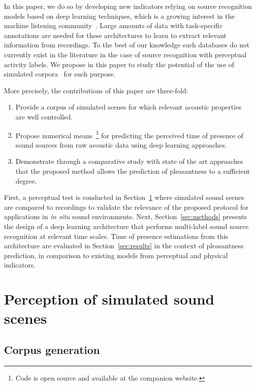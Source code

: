 \documentclass[11pt,a4paper]{article}
\begin{document}
In this paper, we do so by developing new indicators relying on source recognition models based on deep learning techniques, which is a growing interest in the machine listening community~\cite{cakir2015, salamon2017-2}. Large amounts of data with task-specific annotations are needed for these architectures to learn to extract relevant information from recordings. To the best of our knowledge such databases do not currently exist in the literature in the case of source recognition with perceptual activity labels. We propose in this paper to study the potential of the use of simulated corpora~\cite{rossignol2015, salamon2017} for such purpose.

More precisely, the contributions of this paper are three-fold:
\begin{enumerate}
  \item Provide a corpus of simulated scenes for which relevant acoustic properties are well controlled.
  \item Propose numerical means~\footnote{Code is open source and available at the companion website.} for predicting the perceived time of presence of sound sources from raw acoustic data using deep learning approaches.
  \item Demonstrate through a comparative study with state of the art approaches that the proposed method allows the prediction of pleasantness to a sufficient degree.
\end{enumerate}

First, a perceptual test is conducted in Section~\ref{sec:data} where simulated sound scenes are compared to recordings to validate the relevance of the proposed protocol for applications in \textit{in situ} sound environments. Next, Section~\ref{sec:methods} presents the design of a deep learning architecture that performs multi-label sound source recognition at relevant time scales. Time of presence estimations from this architecture are evaluated in Section~\ref{sec:results} in the context of pleasantness prediction, in comparison to existing models from perceptual and physical indicators.

\section{Perception of simulated sound scenes}
\label{sec:data}

\subsection{Corpus generation}
\label{sec:data_corp}
\end{document}
